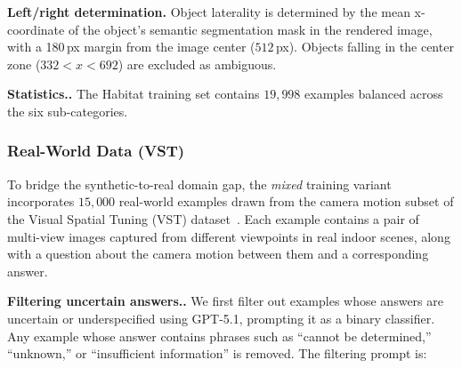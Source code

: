 \documentclass{llmxive}
\providecommand{\paragraph}[1]{\vspace{.5em}\noindent\textbf{#1.}}
\begin{document}
\noindent\textbf{Left/right determination.}
Object laterality is determined by the mean x-coordinate of the object's semantic segmentation mask in the rendered image, with a 180\,px margin from the image center ($512$\,px).
Objects falling in the center zone ($332 < x < 692$) are excluded as ambiguous.

\paragraph{Statistics.}
The Habitat training set contains $19{,}998$ examples balanced across the six sub-categories.


\subsubsection{Real-World Data (VST)}


To bridge the synthetic-to-real domain gap, the \emph{mixed} training variant incorporates $15{,}000$ real-world examples drawn from the camera motion subset of the Visual Spatial Tuning (VST) dataset~\cite{yang2025visual}. Each example contains a pair of multi-view images captured from different viewpoints in real indoor scenes, along with a question about the camera motion between them and a corresponding answer.
 
\paragraph{Filtering uncertain answers.}
We first filter out examples whose answers are uncertain or underspecified using GPT-5.1, prompting it as a binary classifier. Any example whose answer contains phrases such as ``cannot be determined,'' ``unknown,'' or ``insufficient information'' is removed. The filtering prompt is:
 
\end{document}
